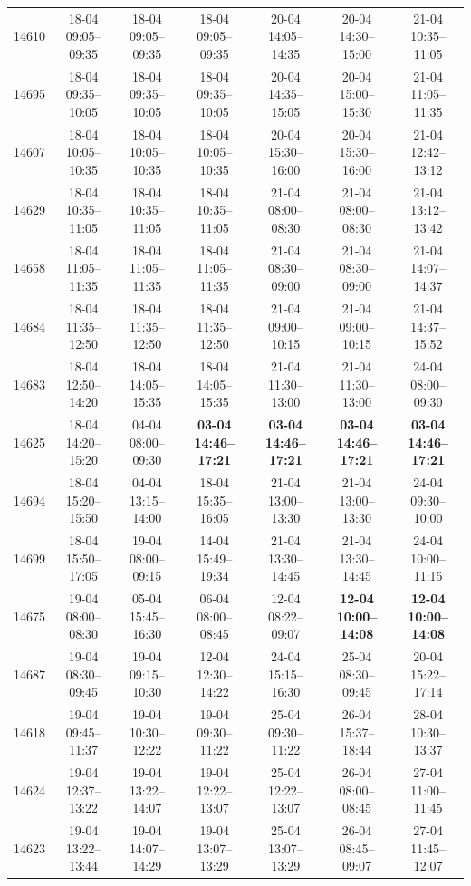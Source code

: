 \begin{table}[htbp]
\begin{tabular}{|r|c|c|c|c|c|c|}
14610 & 18-04 09:05--09:35 & 18-04 09:05--09:35 & 18-04 09:05--09:35 & 20-04 14:05--14:35 & 20-04 14:30--15:00 & 21-04 10:35--11:05 \\ 
14695 & 18-04 09:35--10:05 & 18-04 09:35--10:05 & 18-04 09:35--10:05 & 20-04 14:35--15:05 & 20-04 15:00--15:30 & 21-04 11:05--11:35 \\ 
14607 & 18-04 10:05--10:35 & 18-04 10:05--10:35 & 18-04 10:05--10:35 & 20-04 15:30--16:00 & 20-04 15:30--16:00 & 21-04 12:42--13:12 \\ 
14629 & 18-04 10:35--11:05 & 18-04 10:35--11:05 & 18-04 10:35--11:05 & 21-04 08:00--08:30 & 21-04 08:00--08:30 & 21-04 13:12--13:42 \\ 
14658 & 18-04 11:05--11:35 & 18-04 11:05--11:35 & 18-04 11:05--11:35 & 21-04 08:30--09:00 & 21-04 08:30--09:00 & 21-04 14:07--14:37 \\ 
14684 & 18-04 11:35--12:50 & 18-04 11:35--12:50 & 18-04 11:35--12:50 & 21-04 09:00--10:15 & 21-04 09:00--10:15 & 21-04 14:37--15:52 \\ 
14683 & 18-04 12:50--14:20 & 18-04 14:05--15:35 & 18-04 14:05--15:35 & 21-04 11:30--13:00 & 21-04 11:30--13:00 & 24-04 08:00--09:30 \\ 
14625 & 18-04 14:20--15:20 & 04-04 08:00--09:30 & \textbf{03-04 14:46--17:21} & \textbf{03-04 14:46--17:21} & \textbf{03-04 14:46--17:21} & \textbf{03-04 14:46--17:21} \\ 
14694 & 18-04 15:20--15:50 & 04-04 13:15--14:00 & 18-04 15:35--16:05 & 21-04 13:00--13:30 & 21-04 13:00--13:30 & 24-04 09:30--10:00 \\ 
14699 & 18-04 15:50--17:05 & 19-04 08:00--09:15 & 14-04 15:49--19:34 & 21-04 13:30--14:45 & 21-04 13:30--14:45 & 24-04 10:00--11:15 \\ 
14675 & 19-04 08:00--08:30 & 05-04 15:45--16:30 & 06-04 08:00--08:45 & 12-04 08:22--09:07 & \textbf{12-04 10:00--14:08} & \textbf{12-04 10:00--14:08} \\ 
14687 & 19-04 08:30--09:45 & 19-04 09:15--10:30 & 12-04 12:30--14:22 & 24-04 15:15--16:30 & 25-04 08:30--09:45 & 20-04 15:22--17:14 \\ 
14618 & 19-04 09:45--11:37 & 19-04 10:30--12:22 & 19-04 09:30--11:22 & 25-04 09:30--11:22 & 26-04 15:37--18:44 & 28-04 10:30--13:37 \\ 
14624 & 19-04 12:37--13:22 & 19-04 13:22--14:07 & 19-04 12:22--13:07 & 25-04 12:22--13:07 & 26-04 08:00--08:45 & 27-04 11:00--11:45 \\ 
14623 & 19-04 13:22--13:44 & 19-04 14:07--14:29 & 19-04 13:07--13:29 & 25-04 13:07--13:29 & 26-04 08:45--09:07 & 27-04 11:45--12:07 \\ 

\end{tabular}
\end{table}

